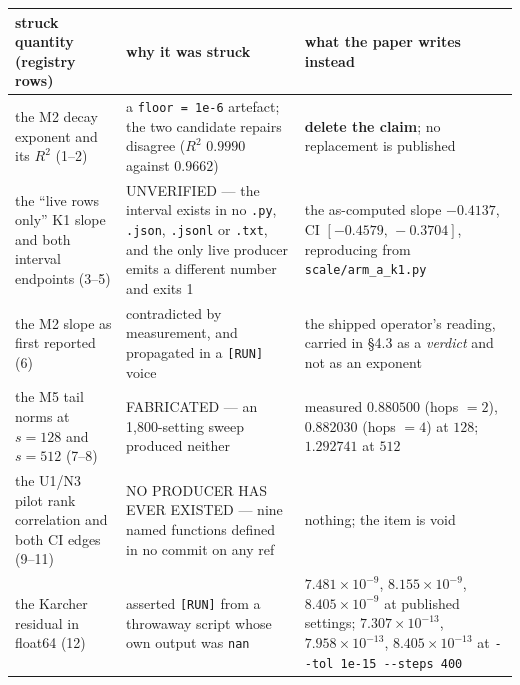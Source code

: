 \documentclass[11pt,a4paper]{article}
\newcounter{none}                 %
\theoremstyle{plain}
\theoremstyle{definition}
\theoremstyle{remark}
\begin{document}
{\def\LTcaptype{none} %
\begin{longtable}[]{@{}
  >{\raggedright\arraybackslash}p{}
  >{\raggedright\arraybackslash}p{}
  >{\raggedright\arraybackslash}p{}@{}}
\toprule\noalign{}
\begin{minipage}[b]{\linewidth}\raggedright
struck quantity (registry rows)
\end{minipage} & \begin{minipage}[b]{\linewidth}\raggedright
why it was struck
\end{minipage} & \begin{minipage}[b]{\linewidth}\raggedright
what the paper writes instead
\end{minipage} \\
\midrule\noalign{}
\endhead
\bottomrule\noalign{}
\endlastfoot
the M2 decay exponent and its \(R^{2}\) (1--2) & a
\texttt{floor\ =\ 1e-6} artefact; the two candidate repairs disagree
(\(R^{2}\) \(0.9990\) against \(0.9662\)) & \textbf{delete the claim};
no replacement is published \\
the ``live rows only'' K1 slope and both interval endpoints (3--5) &
UNVERIFIED --- the interval exists in no \texttt{.py}, \texttt{.json},
\texttt{.jsonl} or \texttt{.txt}, and the only live producer emits a
different number and exits 1 & the as-computed slope \(-0.4137\), CI
\([-0.4579,\,-0.3704]\), reproducing from
\texttt{scale/arm\_a\_k1.py} \\
the M2 slope as first reported (6) & contradicted by measurement, and
propagated in a \texttt{{[}RUN{]}} voice & the shipped operator's
reading, carried in §4.3 as a \emph{verdict} and not as an exponent \\
the M5 tail norms at \(s=128\) and \(s=512\) (7--8) & FABRICATED --- an
1,800-setting sweep produced neither & measured \(0.880500\) (hops
\(=2\)), \(0.882030\) (hops \(=4\)) at \(128\); \(1.292741\) at
\(512\) \\
the U1/N3 pilot rank correlation and both CI edges (9--11) & NO PRODUCER
HAS EVER EXISTED --- nine named functions defined in no commit on any
ref & nothing; the item is void \\
the Karcher residual in float64 (12) & asserted \texttt{{[}RUN{]}} from
a throwaway script whose own output was \texttt{nan} &
\(7.481\times10^{-9}\), \(8.155\times10^{-9}\), \(8.405\times10^{-9}\)
at published settings; \(7.307\times10^{-13}\), \(7.958\times10^{-13}\),
\(8.405\times10^{-13}\) at \texttt{-\/-tol\ 1e-15\ -\/-steps\ 400} \\
\end{longtable}
}
\end{document}
